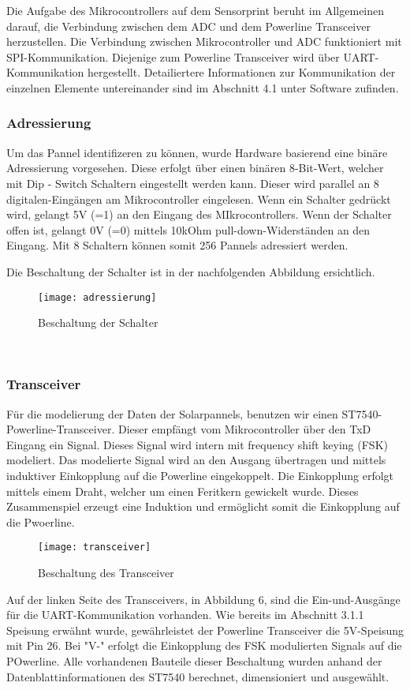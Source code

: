 Die Aufgabe des Mikrocontrollers auf dem Sensorprint beruht im Allgemeinen darauf, die Verbindung zwischen dem ADC und dem Powerline Transceiver herzustellen. Die Verbindung zwischen Mikrocontroller und ADC funktioniert mit SPI-Kommunikation. Diejenige zum Powerline Transceiver wird über UART-Kommunikation hergestellt. Detailiertere Informationen zur Kommunikation der einzelnen Elemente untereinander sind im Abschnitt 4.1 unter Software zufinden.


\clearpage

\subsubsection{Adressierung}
Um das Pannel identifizeren zu können, wurde Hardware basierend eine binäre Adressierung vorgesehen. Diese erfolgt über einen binären 8-Bit-Wert, welcher mit Dip - Switch Schaltern eingestellt werden kann. Dieser wird parallel an 8 digitalen-Eingängen am Mikrocontroller eingelesen. Wenn ein Schalter gedrückt wird, gelangt 5V (=1) an den Eingang des MIkrocontrollers. Wenn der Schalter offen ist, gelangt 0V (=0) mittels 10kOhm pull-down-Widerständen an den Eingang. Mit 8 Schaltern können somit 256 Pannels adressiert werden. 

Die Beschaltung der Schalter ist in der nachfolgenden Abbildung ersichtlich.

\begin{figure}[h]
\centering
\texttt{[image: adressierung]}
\caption{Beschaltung der Schalter}
\end{figure}

\
\

\subsubsection{Transceiver}
Für die modelierung der Daten der Solarpannels, benutzen wir einen ST7540-Powerline-Transceiver. Dieser empfängt vom Mikrocontroller über den TxD Eingang ein Signal. Dieses Signal wird intern mit frequency shift keying (FSK) modeliert. Das modelierte Signal wird an den Ausgang übertragen und mittels induktiver Einkopplung auf die Powerline eingekoppelt. Die Einkopplung erfolgt mittels einem Draht, welcher um einen Feritkern gewickelt wurde. Dieses Zusammenspiel erzeugt eine Induktion und ermöglicht somit die Einkopplung auf die Pwoerline.

\clearpage

\begin{figure}[h]
\centering
\texttt{[image: transceiver]}
\caption{Beschaltung des Transceiver}
\end{figure}

Auf der linken Seite des Transceivers, in Abbildung 6, sind die Ein-und-Ausgänge für die UART-Kommunikation vorhanden. Wie bereits im Abschnitt 3.1.1 Speisung erwähnt wurde, gewährleistet der Powerline Transceiver die 5V-Speisung mit Pin 26.
Bei "V-" erfolgt die Einkopplung des FSK modulierten Signals auf die POwerline. Alle vorhandenen Bauteile dieser Beschaltung wurden anhand der Datenblattinformationen des ST7540 berechnet, dimensioniert und ausgewählt.
